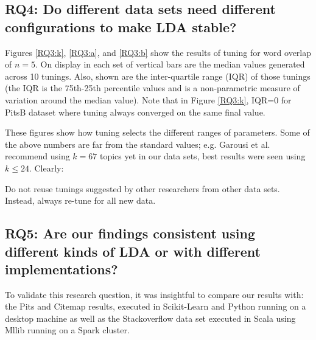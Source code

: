 \documentclass[twocolumn,5p,sort&compress]{elsarticle}
\theoremstyle{break}
\begin{document}
\subsection{\textbf{RQ4: Do different data sets
      need different configurations to make LDA stable?}}\label{sect:diff}

Figures \ref{RQ3:k}, \ref{RQ3:a}, and \ref{RQ3:b} show the results of tuning for word overlap of $n=5$.
On display in each set of vertical bars are
the median values generated across 10 tunings.
Also, shown are
the inter-quartile range (IQR) of those tunings (the IQR is the 75th-25th percentile values and is a non-parametric measure of variation
around the median value). Note that in Figure \ref{RQ3:k}, IQR=0 for  PitsB dataset where tuning
          always converged on the same final value.

  These figures
show how tuning selects the different ranges  of
parameters. 
Some of the above numbers are far from the standard values; e.g. Garousi et al.~\cite{garousi2016citations} recommend using $k=67$ topics
yet in our data sets, best results were seen using $k \le 24$.
Clearly:

\begin{lesson}
  Do not  reuse tunings suggested by other researchers from other data sets.
  Instead, always re-tune for all new data.
\end{lesson}

\subsection{\textbf{RQ5}: \textbf{Are our findings consistent using different kinds of LDA or with different implementations?}}

To validate this research question, it was insightful to compare our results with: the Pits and Citemap results, executed in Scikit-Learn and Python running on a desktop machine as well as the Stackoverflow data set executed in Scala using Mllib running on a Spark cluster.
\end{document}
